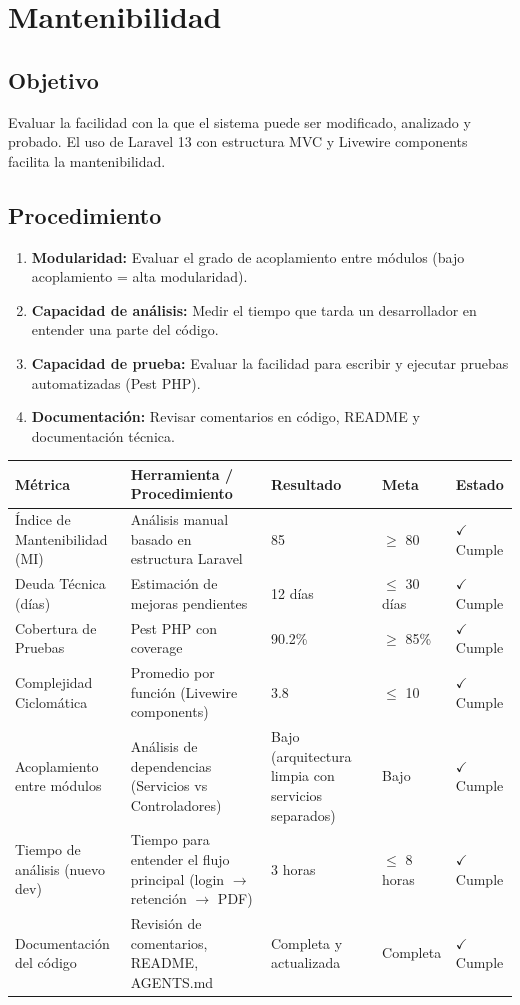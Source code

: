 \documentclass[stu]{apa7}
\begin{document}
\section{Mantenibilidad}

\subsection{Objetivo}

Evaluar la facilidad con la que el sistema puede ser modificado, analizado y probado. El uso de Laravel 13 con estructura MVC y Livewire components facilita la mantenibilidad.

\subsection{Procedimiento}

\begin{enumerate}
    \item \textbf{Modularidad:} Evaluar el grado de acoplamiento entre módulos (bajo acoplamiento = alta modularidad).
    \item \textbf{Capacidad de análisis:} Medir el tiempo que tarda un desarrollador en entender una parte del código.
    \item \textbf{Capacidad de prueba:} Evaluar la facilidad para escribir y ejecutar pruebas automatizadas (Pest PHP).
    \item \textbf{Documentación:} Revisar comentarios en código, README y documentación técnica.
\end{enumerate}

\begin{longtable}{|L{4.5cm}|L{3.5cm}|C{2.5cm}|C{2cm}|C{1.5cm}|}
\hline
{}
\textbf{Métrica} & \textbf{Herramienta / Procedimiento} & \textbf{Resultado} & \textbf{Meta} & \textbf{Estado} \\
\hline
Índice de Mantenibilidad (MI) & Análisis manual basado en estructura Laravel & 85 & $\geq$ 80 & $\checkmark$ Cumple \\
\hline
Deuda Técnica (días) & Estimación de mejoras pendientes & 12 días & $\leq$ 30 días & $\checkmark$ Cumple \\
\hline
Cobertura de Pruebas & Pest PHP con coverage & 90.2\% & $\geq$ 85\% & $\checkmark$ Cumple \\
\hline
Complejidad Ciclomática & Promedio por función (Livewire components) & 3.8 & $\leq$ 10 & $\checkmark$ Cumple \\
\hline
Acoplamiento entre módulos & Análisis de dependencias (Servicios vs Controladores) & Bajo (arquitectura limpia con servicios separados) & Bajo & $\checkmark$ Cumple \\
\hline
Tiempo de análisis (nuevo dev) & Tiempo para entender el flujo principal (login $\rightarrow$ retención $\rightarrow$ PDF) & 3 horas & $\leq$ 8 horas & $\checkmark$ Cumple \\
\hline
Documentación del código & Revisión de comentarios, README, AGENTS.md & Completa y actualizada & Completa & $\checkmark$ Cumple \\
\hline
\end{longtable}
\end{document}

